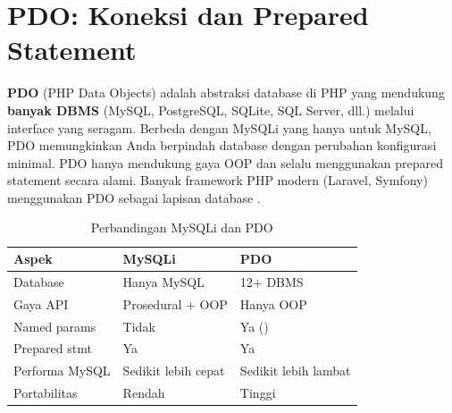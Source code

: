 \section{PDO: Koneksi dan Prepared Statement}

\textbf{PDO} (PHP Data Objects) adalah abstraksi database di PHP yang mendukung \textbf{banyak DBMS} (MySQL, PostgreSQL, SQLite, SQL Server, dll.) melalui interface yang seragam. Berbeda dengan MySQLi yang hanya untuk MySQL, PDO memungkinkan Anda berpindah database dengan perubahan konfigurasi minimal. PDO hanya mendukung gaya OOP dan selalu menggunakan prepared statement secara alami. Banyak framework PHP modern (Laravel, Symfony) menggunakan PDO sebagai lapisan database \cite{phpManual}.

\begin{table}[ht]
\centering
\begin{tabular}{|P{3.5cm}|P{5cm}|P{5cm}|}
\hline
\textbf{Aspek} & \textbf{MySQLi} & \textbf{PDO} \\
\hline
Database & Hanya MySQL & 12+ DBMS \\
\hline
Gaya API & Prosedural + OOP & Hanya OOP \\
\hline
Named params & Tidak & Ya () \\
\hline
Prepared stmt & Ya & Ya \\
\hline
Performa MySQL & Sedikit lebih cepat & Sedikit lebih lambat \\
\hline
Portabilitas & Rendah & Tinggi \\
\hline
\end{tabular}
\caption{Perbandingan MySQLi dan PDO}
\end{table}


